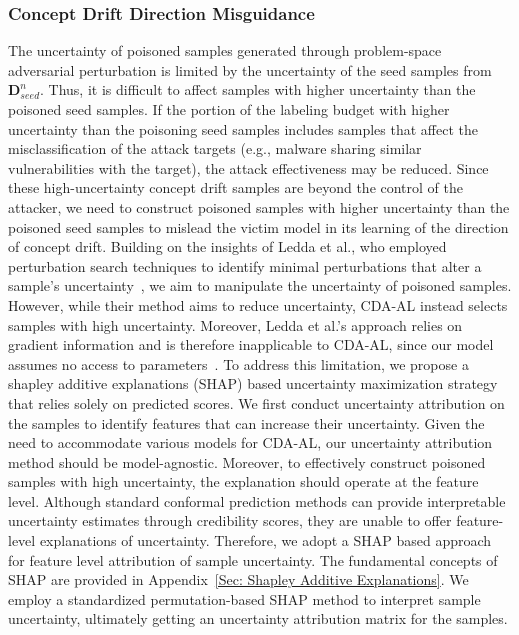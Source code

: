 \subsubsection{Concept Drift Direction Misguidance}
\label{Sec: Strategy II: Feature-Space Perturbation}
The uncertainty of poisoned samples generated through problem-space adversarial perturbation is limited by the uncertainty of the seed samples from $\bm{D}_{seed}^{n}$.
Thus, it is difficult to affect samples with higher uncertainty than the poisoned seed samples.
If the portion of the labeling budget with higher uncertainty than the poisoning seed samples includes samples that affect the misclassification of the attack targets (e.g., malware sharing similar vulnerabilities with the target), the attack effectiveness may be reduced.
Since these high-uncertainty concept drift samples are beyond the control of the attacker, we need to construct poisoned samples with higher uncertainty than the poisoned seed samples to mislead the victim model in its learning of the direction of concept drift.
Building on the insights of Ledda et al., who employed perturbation search techniques to identify minimal perturbations that alter a sample's uncertainty~\cite{Ledda_2023_ICCV}, we aim to manipulate the uncertainty of poisoned samples.
However, while their method aims to reduce uncertainty, CDA-AL instead selects samples with high uncertainty.
Moreover, Ledda et al.’s approach relies on gradient information and is therefore inapplicable to CDA-AL, since our model assumes no access to parameters~\cite{Ledda_2023_ICCV}.
To address this limitation, we propose a shapley additive explanations (SHAP) based uncertainty maximization strategy that relies solely on predicted scores.
We first conduct uncertainty attribution on the samples to identify features that can increase their uncertainty.
Given the need to accommodate various models for CDA-AL, our uncertainty attribution method should be model-agnostic.
Moreover, to effectively construct poisoned samples with high uncertainty, the explanation should operate at the feature level.
Although standard conformal prediction methods can provide interpretable uncertainty estimates through credibility scores, they are unable to offer feature-level explanations of uncertainty.
Therefore, we adopt a SHAP based approach for feature level attribution of sample uncertainty.
The fundamental concepts of SHAP are provided in Appendix~\ref{Sec: Shapley Additive Explanations}.
We employ a standardized permutation-based SHAP method to interpret sample uncertainty, ultimately getting an uncertainty attribution matrix for the samples.

